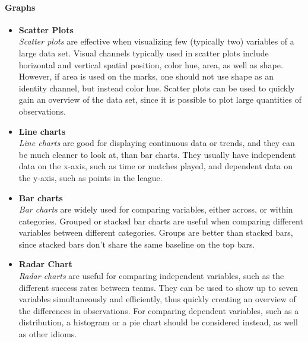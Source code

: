 \documentclass[Report.tex]{subfiles}
\begin{document}
\paragraph{Graphs}
\begin{itemize}
  \item \textbf{Scatter Plots}
  \\\emph{Scatter plots} are effective when visualizing few (typically two) variables
  of a large data set\cite[Chapter 5, p. 54]{Iliinsky}. Visual channels typically used in
  scatter plots include horizontal and vertical spatial position, color hue, area, as well as shape. However,
  if area is used on the marks, one should not use shape as an identity channel,
  but instead color hue. 
  Scatter plots can be used to quickly gain an overview of the data set, since
  it is possible to plot large quantities of observations.
  
  \item \textbf{Line charts}
  \\\emph{Line charts} are good for displaying continuous data or trends, and they can
  be much cleaner to look at, than bar charts. They usually have independent
  data on the x-axis, such as time or matches played, and dependent data on the
  y-axis, such as points in the league.
  
  \item \textbf{Bar charts}
  \\\emph{Bar charts} are widely used for comparing variables, either across, or within
  categories. Grouped or stacked bar charts are useful when comparing different variables between different categories.
 Groups are better than stacked bars, since stacked
  bars don't share the same baseline on the top bars.
  
  \item \textbf{Radar Chart}
  \\\emph{Radar charts} are useful for comparing independent variables, such as the
  different success rates between teams. They can be used to show up to seven
  variables simultaneously and efficiently, thus quickly creating an overview of the
  differences in observations. For comparing dependent variables, such as a
  distribution, a histogram or a pie chart should be considered instead, as well
  as other idioms.

\end{itemize}
\end{document}
